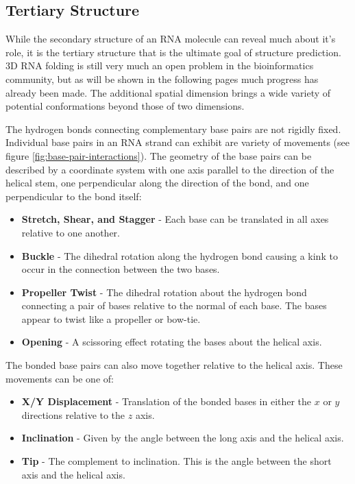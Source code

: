 \documentclass[journal]{IEEEtran}
\begin{document}
\subsection{Tertiary Structure}
\label{subsec:intro-rna-ter-structure}
While the secondary structure of an RNA molecule can reveal much about it's role, it is the tertiary structure that is the ultimate goal of structure prediction. 3D RNA folding is still very much an open problem in the bioinformatics community, but as will be shown in the following pages much progress has already been made. The additional spatial dimension brings a wide variety of potential conformations beyond those of two dimensions.

The hydrogen bonds connecting complementary base pairs are not rigidly fixed. Individual base pairs in an RNA strand can exhibit are variety of movements (see figure \ref{fig:base-pair-interactions}). The geometry of the base pairs can be described by a coordinate system with one axis parallel to the direction of the helical stem, one perpendicular along the direction of the bond, and one perpendicular to the bond itself:

\begin{itemize}
	\item \textbf{Stretch, Shear, and Stagger} - Each base can be translated in all axes relative to one another.

	\item \textbf{Buckle} - The dihedral rotation along the hydrogen bond causing a kink to occur in the connection between the two bases.

	\item \textbf{Propeller Twist} - The dihedral rotation about the hydrogen bond connecting a pair of bases relative to the normal of each base. The bases appear to twist like a propeller or bow-tie.
	\item \textbf{Opening} - A scissoring effect rotating the bases about the helical axis.
\end{itemize}

The bonded base pairs can also move together relative to the helical axis. These movements can be one of:

\begin{itemize}
	\item \textbf{X/Y Displacement} - Translation of the bonded bases in either the $x$ or $y$ directions relative to the $z$ axis.
	\item \textbf{Inclination} - Given by the angle between the long axis and the helical axis.
	\item \textbf{Tip} - The complement to inclination. This is the angle between the short axis and the helical axis. 
\end{itemize}
\end{document}
